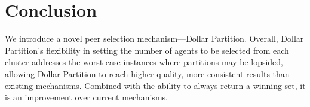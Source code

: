 \documentclass[letterpaper]{article}
\begin{document}
%
%
%
%


\section{Conclusion}

We introduce a novel peer selection mechanism---Dollar Partition.
Overall, Dollar Partition's flexibility in setting the number of agents to be selected from each cluster addresses the worst-case instances where partitions may be lopsided, allowing Dollar Partition to reach higher quality, more consistent results than existing mechanisms. Combined with the ability to always return a winning set, it is an improvement over current mechanisms.
\end{document}
